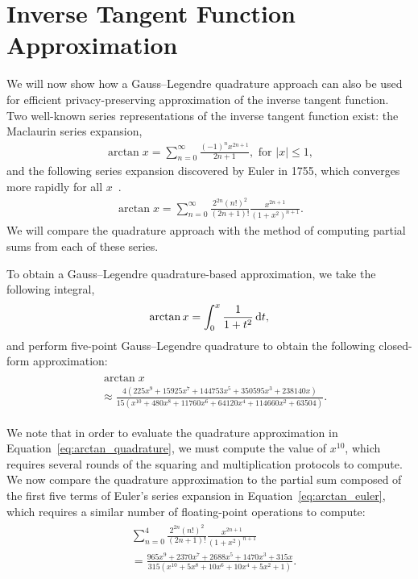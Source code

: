 \section{Inverse Tangent Function Approximation}
\label{sec:arctan_approximation}
We will now show how a Gauss--Legendre quadrature approach can also be used for efficient privacy-preserving approximation of the inverse tangent function. Two well-known series representations of the inverse tangent function exist: the Maclaurin series expansion,
\begin{align} \label{eq:arctan_maclaurin}
	\arctan x = \sum_{n=0}^{\infty}{\frac{(-1)^nx^{2n+1}}{2n+1}}, \text{ for }|x|\leq 1,
\end{align}
and the following series expansion discovered by Euler in 1755, which converges more rapidly for all $x$~\cite{chien-lih_89.67_2005}.
\begin{align} \label{eq:arctan_euler}
	\arctan x = \sum_{n=0}^{\infty}
	{
	\frac
		{2^{2n}(n!)^2}
		{(2n+1)!}
	\frac
		{x^{2n+1}}
		{(1+x^2)^{n+1}}
	}.
\end{align}
We will compare the quadrature approach with the method of computing partial sums from each of these series.

To obtain a Gauss--Legendre quadrature-based approximation, we take the following integral,
\begin{align*}
	\arctan x = \int_0^x{\frac{1}{1+t^2}\mathop{}\!\mathrm{d} t},
\end{align*}
and perform five-point Gauss--Legendre quadrature to obtain the following closed-form approximation:
\begin{align} \label{eq:arctan_quadrature}
	\begin{split}
		&\arctan x \\
		&\approx \frac
		{4\left(225x^9 + 15925x^7 + 144753x^5 + 350595x^3 + 238140x\right)}
		{15\left(x^{10} + 480x^8 + 11760x^6 + 64120x^4 + 114660x^2 + 63504\right)}.
	\end{split}
\end{align}

We note that in order to evaluate the quadrature approximation in Equation~\ref{eq:arctan_quadrature}, we must compute the value of $x^{10}$, which requires several rounds of the squaring and multiplication protocols to compute. We now compare the quadrature approximation to the partial sum composed of the first five terms of Euler's series expansion in Equation~\ref{eq:arctan_euler}, which requires a similar number of floating-point operations to compute:
\begin{align} \label{eq:arctan_euler_partial}
	\begin{split}
		&\sum_{n=0}^{4}
		{
		\frac
			{2^{2n}(n!)^2}
			{(2n+1)!}
		\frac
			{x^{2n+1}}
			{(1+x^2)^{n+1}}
		}\\
		&= \frac
		{965x^9 + 2370x^7 + 2688x^5 + 1470x^3 + 315x}
		{315\left(x^{10} + 5x^8 + 10x^6 + 10x^4 + 5x^2 + 1\right)}.
	\end{split}
\end{align}

